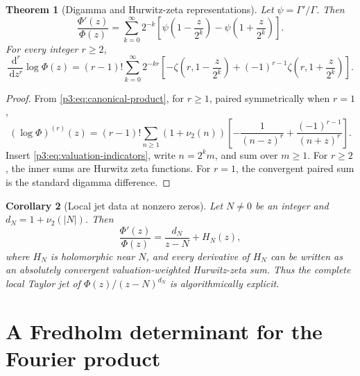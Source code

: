 \documentclass[11pt,oneside]{article}
\newtheorem{theorem}{Theorem}[section]
\newtheorem{corollary}[theorem]{Corollary}
\theoremstyle{definition}
\newcommand{\dd}{\,\mathrm d}
\begin{document}
\begin{theorem}[Digamma and Hurwitz-zeta representations]\label{p3:thm:hurwitz}
Let \(\psi=\Gamma'/\Gamma\).  Then
\begin{equation}
 \boxed{
 \frac{\Phi'(z)}{\Phi(z)}
 =\sum_{k=0}^{\infty}2^{-k}
 \left[
 \psi\!\left(1-\frac{z}{2^k}\right)
 -\psi\!\left(1+\frac{z}{2^k}\right)
 \right].
 }                                                           \label{p3:eq:logder-digamma}
\end{equation}
For every integer \(r\ge2\),
\begin{equation}
 \boxed{
 \frac{\dd^r}{\dd z^r}\log\Phi(z)
 =(r-1)!\sum_{k=0}^{\infty}2^{-kr}
 \left[
 -\zeta\!\left(r,1-\frac{z}{2^k}\right)
 +(-1)^{r-1}\zeta\!\left(r,1+\frac{z}{2^k}\right)
 \right].
 }                                                           \label{p3:eq:logder-hurwitz}
\end{equation}
\end{theorem}

\begin{proof}
From \eqref{p3:eq:canonical-product}, for \(r\ge1\), paired symmetrically when \(r=1\),
\begin{equation}
 (\log\Phi)^{(r)}(z)
 =(r-1)!\sum_{n\ge1}(1+\nu_2(n))
 \left[-\frac1{(n-z)^r}+\frac{(-1)^{r-1}}{(n+z)^r}\right].   \label{p3:eq:logder-general-zero}
\end{equation}
Insert \eqref{p3:eq:valuation-indicators}, write \(n=2^k m\), and sum over \(m\ge1\).
For \(r\ge2\), the inner sums are Hurwitz zeta functions.  For \(r=1\), the convergent
paired sum is the standard digamma difference.
\end{proof}

\begin{corollary}[Local jet data at nonzero zeros]
Let \(N\ne0\) be an integer and \(d_N=1+\nu_2(|N|)\).  Then
\begin{equation}
 \frac{\Phi'(z)}{\Phi(z)}=\frac{d_N}{z-N}+H_N(z),             \label{p3:eq:local-logder-zero}
\end{equation}
where \(H_N\) is holomorphic near \(N\), and every derivative of \(H_N\) can be written
as an absolutely convergent valuation-weighted Hurwitz-zeta sum.  Thus the complete local
Taylor jet of \(\Phi(z)/(z-N)^{d_N}\) is algorithmically explicit.
\end{corollary}

\section{A Fredholm determinant for the Fourier product}\label{p3:sec:fredholm}
\end{document}
